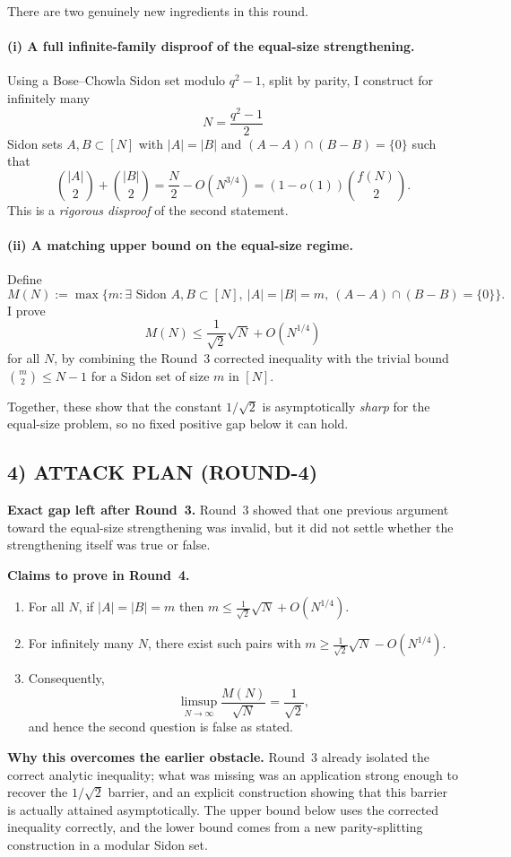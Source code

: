 There are two genuinely new ingredients in this round.

\paragraph{(i) A full infinite-family disproof of the equal-size strengthening.}
Using a Bose--Chowla Sidon set modulo $q^2-1$, split by parity, I construct for infinitely many
\[
N=\frac{q^2-1}{2}
\]
Sidon sets $A,B\subset[N]$ with $|A|=|B|$ and $(A-A)\cap(B-B)=\{0\}$ such that
\[
\binom{|A|}{2}+\binom{|B|}{2}=\frac N2-O(N^{3/4})=(1-o(1))\binom{f(N)}{2}.
\]
This is a \emph{rigorous disproof} of the second statement.

\paragraph{(ii) A matching upper bound on the equal-size regime.}
Define
\[
M(N):=\max\bigl\{m:\exists\text{ Sidon }A,B\subset[N],\ |A|=|B|=m,\ (A-A)\cap(B-B)=\{0\}\bigr\}.
\]
I prove
\[
M(N)\le \frac1{\sqrt2}\sqrt N+O(N^{1/4})
\]
for all $N$, by combining the Round~3 corrected inequality with the trivial bound $\binom{m}{2}\le N-1$ for a Sidon set of size $m$ in $[N]$.

Together, these show that the constant $1/\sqrt2$ is asymptotically \emph{sharp} for the equal-size problem, so no fixed positive gap below it can hold.

\subsection{4) ATTACK PLAN (ROUND-4)}

\textbf{Exact gap left after Round~3.}
Round~3 showed that one previous argument toward the equal-size strengthening was invalid, but it did not settle whether the strengthening itself was true or false.

\textbf{Claims to prove in Round~4.}
\begin{enumerate}
\item For all $N$, if $|A|=|B|=m$ then $m\le \frac1{\sqrt2}\sqrt N+O(N^{1/4})$.
\item For infinitely many $N$, there exist such pairs with $m\ge \frac1{\sqrt2}\sqrt N-O(N^{1/4})$.
\item Consequently,
\[
\limsup_{N\to\infty}\frac{M(N)}{\sqrt N}=\frac1{\sqrt2},
\]
and hence the second question is false as stated.
\end{enumerate}

\textbf{Why this overcomes the earlier obstacle.}
Round~3 already isolated the correct analytic inequality; what was missing was an application strong enough to recover the $1/\sqrt2$ barrier, and an explicit construction showing that this barrier is actually attained asymptotically.  The upper bound below uses the corrected inequality correctly, and the lower bound comes from a new parity-splitting construction in a modular Sidon set.

